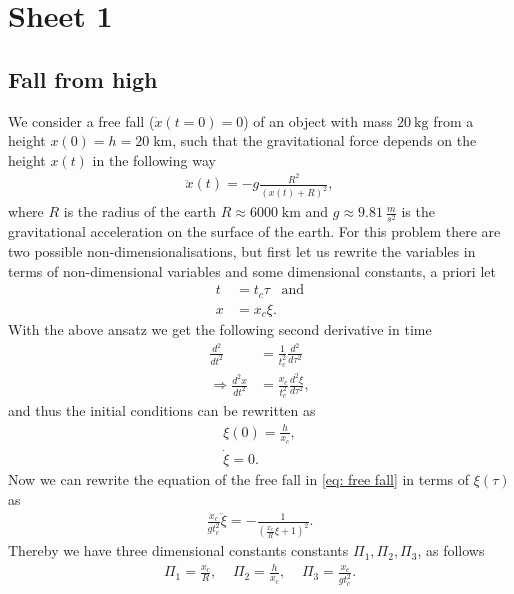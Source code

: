 


\maketitle
\tableofcontents

\section{Sheet 1}

\subsection{Fall from high}
We consider a free fall ($\dot{x}(t=0)=0$) of an object with mass $20\
\text{kg}$ from a height $x(0) = h = 20\; \text{km}$, such that the
gravitational force depends on the height $x(t)$ in the following way
\begin{align}\label{eq: free fall}
    \ddot{x}(t) = -g\frac{R^2}{(x(t) + R)^2},
\end{align}
where $R$ is the radius of the earth $R \approx 6000\; \text{km}$ and $g
\approx 9.81\ \frac{m}{s^2}$ is the gravitational acceleration on the surface
of the earth. For this problem there are two possible non-dimensionalisations,
but first let us rewrite the variables in terms of non-dimensional variables
and some dimensional constants, a priori let
\begin{align}
    t &= t_c \tau \;\;\; \text{and}\\
    x &= x_c \xi.
\end{align}
With the above ansatz we get the following second derivative in
time
\begin{align}
        \frac{d^2}{dt^2} &= \frac{1}{t_c^2}\frac{d^2}{d\tau^2} \\
        \Rightarrow \frac{d^2x}{dt^2} &= \frac{x_c}{t_c^2}
        \frac{d^2\xi}{d\tau^2},
\end{align}
and thus the initial conditions can be rewritten as
\begin{align}
    \xi(0) = \frac{h}{x_c},\\
    \dot{\xi} = 0.
\end{align}
Now we can rewrite the equation of the free fall in \ref{eq: free fall} in
terms of $\xi(\tau)$ as
\begin{align}
   \frac{x_c}{gt_c^2} \ddot{\xi} = -\frac{1}{(\frac{x_c}{R}\xi +1)^2}.
\end{align}
Thereby we have three dimensional constants constants $\Pi_1, \Pi_2, \Pi_3$,
as follows
\begin{align}
    \Pi_1 = \frac{x_c}{R}, \;\;\;\; \Pi_2 = \frac{h}{x_c}, \;\;\;\;
    \Pi_3 = \frac{x_c}{gt_c^2}.
\end{align}

